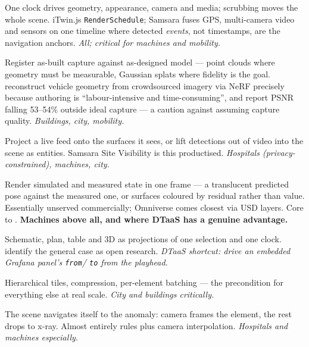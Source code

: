 \begin{description}[leftmargin=1.55cm, style=nextline, itemsep=3pt, font=\bfseries\color{dtblue}]
\item[T6 4D replay] One clock drives geometry, appearance, camera and media; scrubbing
moves the whole scene. iTwin.js \texttt{RenderSchedule}; Samsara fuses GPS, multi-camera
video and sensors on one timeline where detected \emph{events}, not timestamps, are the
navigation anchors. \emph{All; critical for machines and mobility.}

\item[T7 Reality-capture fusion] Register as-built capture against as-designed model ---
point clouds where geometry must be measurable, Gaussian splats where fidelity is the
goal. \citet{mobilitydt2023} reconstruct vehicle geometry from crowdsourced imagery via
NeRF precisely because authoring is ``labour-intensive and time-consuming'', and report
PSNR falling 53--54\% outside ideal capture --- a caution against assuming capture
quality. \emph{Buildings, city, mobility.}

\item[T8 Video projection] Project a live feed onto the surfaces it sees, or lift
detections out of video into the scene as entities. Samsara Site Visibility is this
productised. \emph{Hospitals (privacy-constrained), machines, city.}

\item[T9 Ghost twin / residual] Render simulated and measured state in one frame --- a
translucent predicted pose against the measured one, or surfaces coloured by residual
rather than value. Essentially unserved commercially; Omniverse comes closest via USD
layers. Core to \citet{liao2025digital}. \textbf{Machines above all, and where DTaaS has
a genuine advantage.}

\item[T10 Linked abstraction levels] Schematic, plan, table and 3D as projections of one
selection and one clock. \citet{ali2024spatial} identify the general case as open
research. \emph{DTaaS shortcut: drive an embedded Grafana panel's \texttt{from}/%
\texttt{to} from the playhead.}

\item[T11 Streaming LOD] Hierarchical tiles, compression, per-element batching --- the
precondition for everything else at real scale. \emph{City and buildings critically.}

\item[T12 Attention routing] The scene navigates itself to the anomaly: camera frames
the element, the rest drops to x-ray. Almost entirely rules plus camera interpolation.
\emph{Hospitals and machines especially.}


\end{description}
